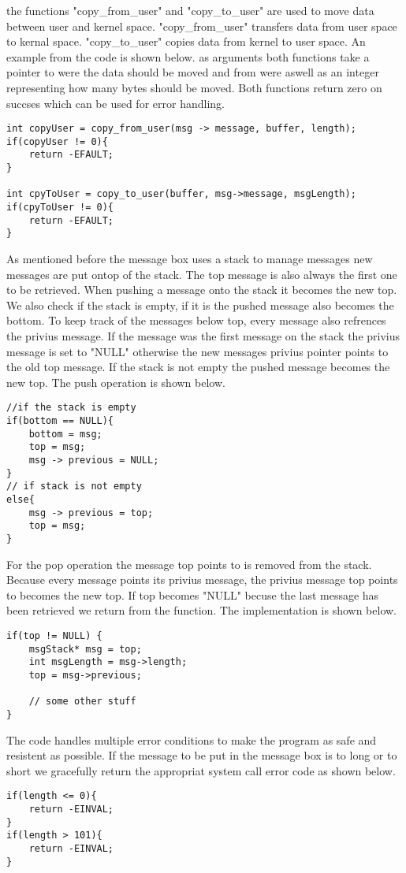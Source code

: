 \documentclass[12pt,a4paper]{report}
\begin{document}
the functions "copy\_from\_user" and "copy\_to\_user" are used to move data between user and kernel space. "copy\_from\_user" transfers data from user space to kernal space. "copy\_to\_user" copies data from kernel to user space. An example from the code is shown below. as arguments both functions take a pointer to were the data should be moved and from were aswell as an integer representing how many bytes should be moved. Both functions return zero on succses which can be used for error handling.
\begin{verbatim}
int copyUser = copy_from_user(msg -> message, buffer, length);
if(copyUser != 0){
    return -EFAULT;
}
 
int cpyToUser = copy_to_user(buffer, msg->message, msgLength);
if(cpyToUser != 0){
    return -EFAULT;
}
\end{verbatim}
As mentioned before the message box uses a stack to manage messages new messages are put ontop of the stack. The top message is also always the first one to be retrieved. When pushing a message onto the stack it becomes the new top. We also check if the stack is empty, if it is the pushed message also becomes the bottom. To keep track of the messages below top, every message also refrences the privius message. If the message was the first message on the stack the privius message is set to "NULL" otherwise the new messages privius pointer points to the old top message. If the stack is not empty the pushed message becomes the new top. The push operation is shown below.
\begin{verbatim}
//if the stack is empty
if(bottom == NULL){
    bottom = msg;
    top = msg;
    msg -> previous = NULL;
}
// if stack is not empty
else{
    msg -> previous = top;
    top = msg;
}
\end{verbatim}
For the pop operation the message top points to is removed from the stack. Because every message points its privius message, the privius message top points to becomes the new top. If top becomes "NULL" becuse the last message has been retrieved we return from the function. The implementation is shown below.
\begin{verbatim}
if(top != NULL) {
    msgStack* msg = top;
    int msgLength = msg->length;
    top = msg->previous;
    
    // some other stuff
}
\end{verbatim}

The code handles multiple error conditions to make the program as safe and resistent as possible. If the message to be put in the message box is to long or to short we gracefully return the appropriat system call error code as shown below.
\begin{verbatim}
if(length <= 0){
    return -EINVAL;
}
if(length > 101){
    return -EINVAL;
}
\end{verbatim}
\end{document}
